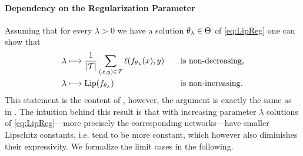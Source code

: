 \paragraph{Dependency on the Regularization Parameter} Assuming that for every $\lambda>0$ we have a solution $\theta_\lambda\in\Theta$ of \cref{eq:LipReg} one can show that
%
\begin{alignat*}{2}
\lambda&\longmapsto
\frac{1}{\left|\mathcal{T}\right|}
\sum_{(x,y)\in\mathcal{T}}\ell(f_{\theta_\lambda}(x),y) \quad&&\text{is non-decreasing,}
\\
\lambda&\longmapsto\operatorname{Lip}(f_{\theta_{\lambda}}) 
\quad&&\text{is non-increasing.}
\end{alignat*}
%
%
This statement is the content of \cite[Prop. 2]{bungert2021clip}, however, the argument is exactly the same as in \cite{burger2013guide}. The intuition behind this result is that with increasing parameter $\lambda$ solutions of \cref{eq:LipReg}---more precisely the corresponding networks---have smaller Lipschitz constants, i.e. tend to be more constant, which however also diminishes their expressivity. We formalize the limit cases in the following.

